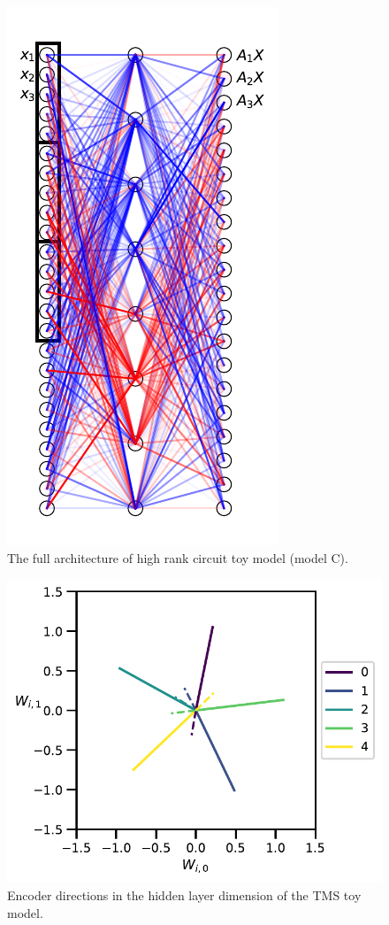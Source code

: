 \documentclass{article}
\theoremstyle{plain}
\theoremstyle{definition}
\theoremstyle{remark}
\begin{document}
\begin{figure}[ht]
    \centerline{\includegraphics{../figures/s1_high_rank_circuit_setup.pdf}}
    \centering
    \caption{The full architecture of high rank circuit toy model (model C).}\label{fig:s1_high_rank_circuit_setup}
\end{figure}



\begin{figure}[ht]
    \centerline{\includegraphics{../figures/s2_tms_encoder_directions.pdf}}
    \centering
    \caption{Encoder directions in the hidden layer dimension of the TMS toy model.}\label{fig:s2_tms_encoder_directions}
\end{figure}
\end{document}
